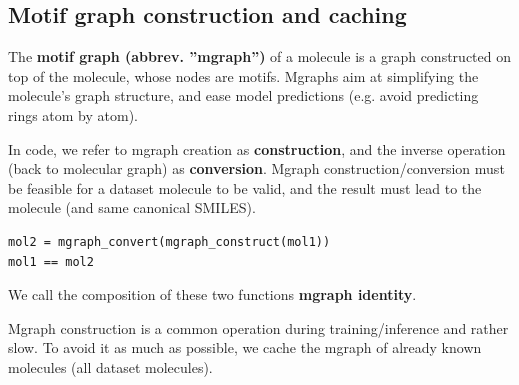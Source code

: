 \documentclass{article}
\begin{document}
\subsection{Motif graph construction and caching}
\label{mgraph_construction_and_caching}

The \textbf{motif graph (abbrev. ''mgraph'')} of a molecule is a graph constructed on top of the molecule, whose nodes are motifs.
Mgraphs aim at simplifying the molecule's graph structure, and ease model predictions (e.g. avoid predicting rings atom by atom).

In code, we refer to mgraph creation as \textbf{construction}, and the inverse operation (back to molecular graph) as \textbf{conversion}.
Mgraph construction/conversion must be feasible for a dataset molecule to be valid, and the result must lead to the molecule (and same canonical SMILES).

\begin{lstlisting}[linewidth=\linewidth]
mol2 = mgraph_convert(mgraph_construct(mol1))
mol1 == mol2
\end{lstlisting}

We call the composition of these two functions \textbf{mgraph identity}.

Mgraph construction is a common operation during training/inference and rather slow.
To avoid it as much as possible, we cache the mgraph of already known molecules (all dataset molecules).
\end{document}
